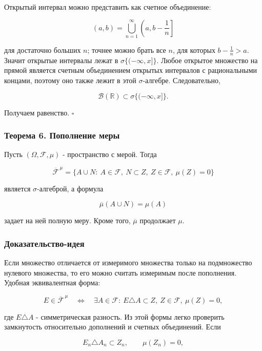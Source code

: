 \documentclass[
  11pt,
  a4paper,
]{article}
\begin{document}
Открытый интервал можно представить как счетное объединение:

\[
(a,b)=\bigcup_{n=1}^{\infty}\left(a,b-\frac1n\right]
\]

для достаточно больших \(n\); точнее можно брать все \(n\), для которых
\(b-\frac1n>a\). Значит открытые интервалы лежат в
\(\sigma\{(-\infty,x]\}\). Любое открытое множество на прямой является
счетным объединением открытых интервалов с рациональными концами,
поэтому оно также лежит в этой \(\sigma\)-алгебре. Следовательно,

\[
\mathcal B(\mathbb R)\subset\sigma\{(-\infty,x]\}.
\]

Получаем равенство. \(\square\)

\subsubsection{Теорема 6. Пополнение
меры}\label{ux442ux435ux43eux440ux435ux43cux430-6.-ux43fux43eux43fux43eux43bux43dux435ux43dux438ux435-ux43cux435ux440ux44b}

Пусть \((\Omega,\mathcal F,\mu)\) - пространство с мерой. Тогда

\[
\overline{\mathcal F}^{\,\mu}
=
\{A\cup N:\ A\in\mathcal F,\ N\subset Z,\ Z\in\mathcal F,\ \mu(Z)=0\}
\]

является \(\sigma\)-алгеброй, а формула

\[
\overline{\mu}(A\cup N)=\mu(A)
\]

задает на ней полную меру. Кроме того, \(\overline{\mu}\) продолжает
\(\mu\).

\subsubsection{Доказательство-идея}\label{ux434ux43eux43aux430ux437ux430ux442ux435ux43bux44cux441ux442ux432ux43e-ux438ux434ux435ux44f-1}

Если множество отличается от измеримого множества только на подмножество
нулевого множества, то его можно считать измеримым после пополнения.
Удобная эквивалентная форма:

\[
E\in\overline{\mathcal F}^{\,\mu}
\quad\Longleftrightarrow\quad
\exists A\in\mathcal F:\ E\triangle A\subset Z,\ Z\in\mathcal F,\ \mu(Z)=0,
\]

где \(E\triangle A\) - симметрическая разность. Из этой формы легко
проверить замкнутость относительно дополнений и счетных объединений.
Если

\[
E_n\triangle A_n\subset Z_n,\qquad \mu(Z_n)=0,
\]
\end{document}
